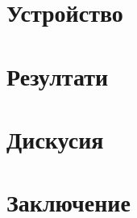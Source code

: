 \documentclass[12pt]{article}
\begin{document}
\section{Устройство}


\newpage
\section{Резултати}


\newpage
\section{Дискусия}


\newpage
\section{Заключение}




\end{document}
